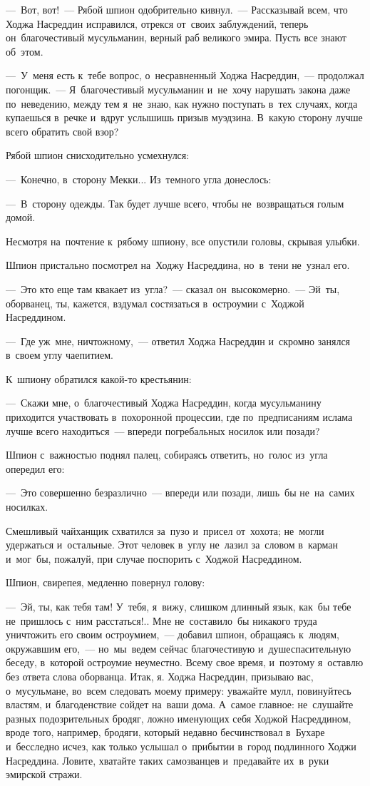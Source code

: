 \documentclass[12pt,a4paper]{book}
\begin{document}
—~Вот, вот!~— Рябой шпион одобрительно кивнул.~— Рассказывай всем, что Ходжа Насреддин исправился, отрекся от~своих заблуждений, теперь он~благочестивый мусульманин, верный раб великого эмира. Пусть все знают об~этом.

—~У~меня есть к~тебе вопрос, о~несравненный Ходжа Насреддин,~— продолжал погонщик.~— Я~благочестивый мусульманин и~не~хочу нарушать закона даже по~неведению, между тем я~не~знаю, как нужно поступать в~тех случаях, когда купаешься в~речке и~вдруг услышишь призыв муэдзина. В~какую сторону лучше всего обратить свой взор?

Рябой шпион снисходительно усмехнулся:

—~Конечно, в~сторону Мекки... Из~темного угла донеслось:

—~В~сторону одежды. Так будет лучше всего, чтобы не~возвращаться голым домой.

Несмотря на~почтение к~рябому шпиону, все опустили головы, скрывая улыбки.

Шпион пристально посмотрел на~Ходжу Насреддина, но~в~тени не~узнал его.

—~Это кто еще там квакает из~угла?~— сказал он~высокомерно.~— Эй~ты, оборванец, ты, кажется, вздумал состязаться в~остроумии с~Ходжой Насреддином.

—~Где уж~мне, ничтожному,~— ответил Ходжа Насреддин и~скромно занялся в~своем углу чаепитием.

К~шпиону обратился какой-то крестьянин:

—~Скажи мне, о~благочестивый Ходжа Насреддин, когда мусульманину приходится участвовать в~похоронной процессии, где по~предписаниям ислама лучше всего находиться~— впереди погребальных носилок или позади?

Шпион с~важностью поднял палец, собираясь ответить, но~голос из~угла опередил его:

—~Это совершенно безразлично~— впереди или позади, лишь~бы не~на~самих носилках.

Смешливый чайханщик схватился за~пузо и~присел от~хохота; не~могли удержаться и~остальные. Этот человек в~углу не~лазил за~словом в~карман и~мог~бы, пожалуй, при случае поспорить с~Ходжой Насреддином.

Шпион, свирепея, медленно повернул голову:

—~Эй, ты, как тебя там! У~тебя, я~вижу, слишком длинный язык, как~бы тебе не~пришлось с~ним расстаться!.. Мне не~составило~бы никакого труда уничтожить его своим остроумием,~— добавил шпион, обращаясь к~людям, окружавшим его,~— но~мы~ведем сейчас благочестивую и~душеспасительную беседу, в~которой остроумие неуместно. Всему свое время, и~поэтому я~оставлю без ответа слова оборванца. Итак, я. Ходжа Насреддин, призываю вас, о~мусульмане, во~всем следовать моему примеру: уважайте мулл, повинуйтесь властям, и~благоденствие сойдет на~ваши дома. А~самое главное: не~слушайте разных подозрительных бродяг, ложно именующих себя Ходжой Насреддином, вроде того, например, бродяги, который недавно бесчинствовал в~Бухаре и~бесследно исчез, как только услышал о~прибытии в~город подлинного Ходжи Насреддина. Ловите, хватайте таких самозванцев и~предавайте их~в~руки эмирской стражи.
\end{document}
